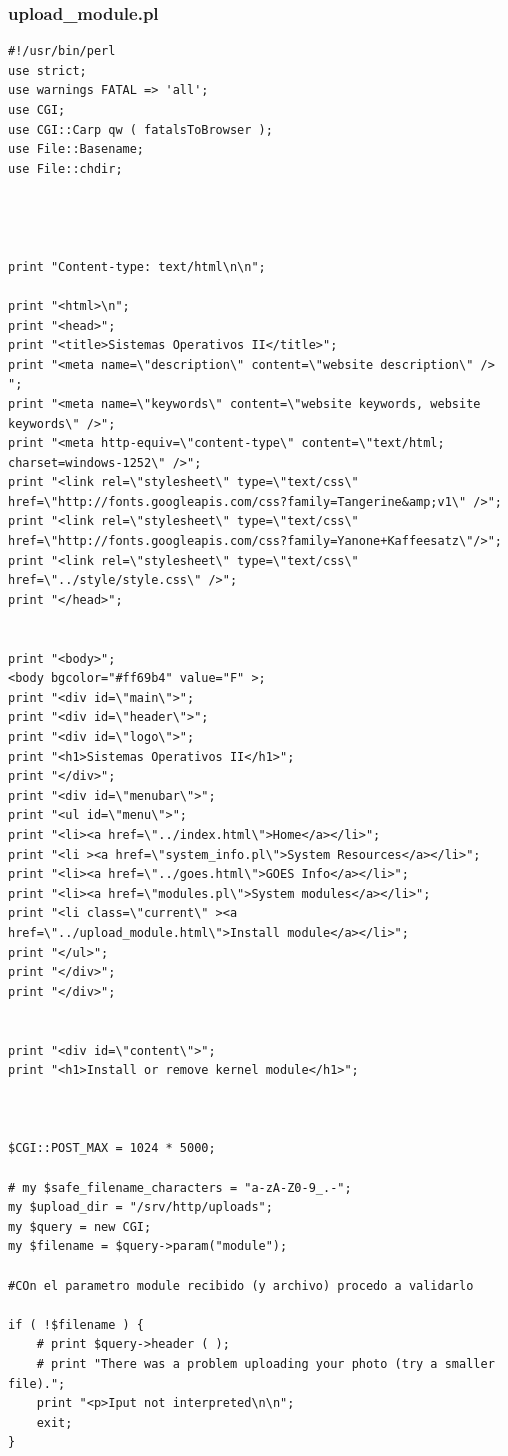 \documentclass{article}
\begin{document}
\subsubsection{upload\_module.pl}
\begin{lstlisting}[style=PerlStyle]
#!/usr/bin/perl
use strict;
use warnings FATAL => 'all';
use CGI;
use CGI::Carp qw ( fatalsToBrowser );
use File::Basename;
use File::chdir;




print "Content-type: text/html\n\n";

print "<html>\n";
print "<head>";
print "<title>Sistemas Operativos II</title>";
print "<meta name=\"description\" content=\"website description\" /> ";
print "<meta name=\"keywords\" content=\"website keywords, website keywords\" />";
print "<meta http-equiv=\"content-type\" content=\"text/html; charset=windows-1252\" />";
print "<link rel=\"stylesheet\" type=\"text/css\" href=\"http://fonts.googleapis.com/css?family=Tangerine&amp;v1\" />";
print "<link rel=\"stylesheet\" type=\"text/css\" href=\"http://fonts.googleapis.com/css?family=Yanone+Kaffeesatz\"/>";
print "<link rel=\"stylesheet\" type=\"text/css\" href=\"../style/style.css\" />";
print "</head>";


print "<body>";
<body bgcolor="#ff69b4" value="F" >;
print "<div id=\"main\">";
print "<div id=\"header\">";
print "<div id=\"logo\">";
print "<h1>Sistemas Operativos II</h1>";
print "</div>";
print "<div id=\"menubar\">";
print "<ul id=\"menu\">";
print "<li><a href=\"../index.html\">Home</a></li>";
print "<li ><a href=\"system_info.pl\">System Resources</a></li>";
print "<li><a href=\"../goes.html\">GOES Info</a></li>";
print "<li><a href=\"modules.pl\">System modules</a></li>";
print "<li class=\"current\" ><a href=\"../upload_module.html\">Install module</a></li>";
print "</ul>";
print "</div>";
print "</div>";


print "<div id=\"content\">";
print "<h1>Install or remove kernel module</h1>";



$CGI::POST_MAX = 1024 * 5000;

# my $safe_filename_characters = "a-zA-Z0-9_.-";
my $upload_dir = "/srv/http/uploads";
my $query = new CGI;
my $filename = $query->param("module");

#COn el parametro module recibido (y archivo) procedo a validarlo

if ( !$filename ) {
    # print $query->header ( );
    # print "There was a problem uploading your photo (try a smaller file).";
    print "<p>Iput not interpreted\n\n";
    exit;
}



\end{lstlisting}
\end{document}
